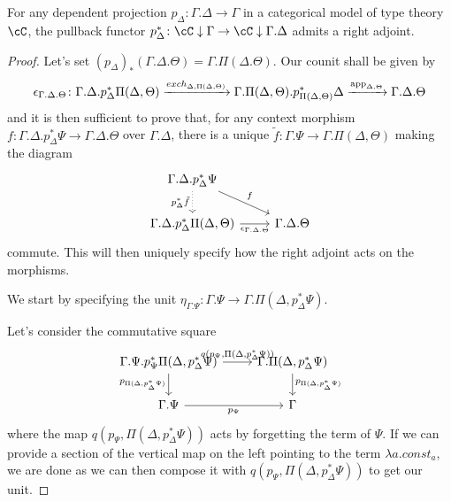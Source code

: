 \documentclass[a4paper,fontsize=12pt]{scrartcl}
\begin{document}
\begin{lem}
  For any dependent projection $p_\Delta\colon\Gamma.\Delta\rightarrow\Gamma$ in
  a categorical model of type theory $\cC$, the pullback functor
  $p_\Delta^*\colon\cC\downarrow\Gamma\rightarrow\cC\downarrow\Gamma.\Delta$
  admits a right adjoint.
\end{lem}
\begin{proof}
  Let's set $(p_\Delta)_*(\Gamma.\Delta.\Theta)=\Gamma.\Pi(\Delta.\Theta)$. Our
  counit shall be given by
  \[\epsilon_{\Gamma.\Delta.\Theta}\colon\Gamma.\Delta.p^*_\Delta\Pi(\Delta,\Theta)
  \xrightarrow{exch_{\Delta,\Pi(\Delta,\Theta)}}\Gamma.\Pi(\Delta,\Theta).p^*_{\Pi(\Delta,\Theta)}\Delta
  \xrightarrow{\operatorname{app}_{\Delta,\Theta}}\Gamma.\Delta.\Theta\]
  and it is then sufficient to prove that, for any context morphism
  $f\colon\Gamma.\Delta.p^*_\Delta\Psi\rightarrow\Gamma.\Delta.\Theta$ over
  $\Gamma.\Delta$, there is
  a unique $\tilde{f}\colon\Gamma.\Psi\rightarrow\Gamma.\Pi(\Delta,\Theta)$
  making the diagram
  \[\begin{tikzcd}
    {\Gamma.\Delta.p^*_\Delta\Psi} \\
    {\Gamma.\Delta.p^*_\Delta\Pi(\Delta,\Theta)} & {\Gamma.\Delta.\Theta}
    \arrow["f", from=1-1, to=2-2]
    \arrow["{\epsilon_{\Gamma.\Delta.\Theta}}"', from=2-1, to=2-2]
    \arrow["{p^*_\Delta\tilde{f}}"', dotted, from=1-1, to=2-1]
  \end{tikzcd}\]
  commute. This will then uniquely specify how the right adjoint acts on the
  morphisms.

  We start by specifying the unit
  $\eta_{\Gamma.\Psi}\colon\Gamma.\Psi\rightarrow\Gamma.\Pi(\Delta,p^*_{\Delta}\Psi)$.

  Let's consider the commutative square
  \[\begin{tikzcd}
    {\Gamma.\Psi.p^*_\Psi\Pi(\Delta,p^*_\Delta\Psi)} & {\Gamma.\Pi(\Delta,p^*_\Delta\Psi)} \\
    {\Gamma.\Psi} & \Gamma
    \arrow["{p_{\Pi(\Delta,p^*_\Delta\Psi)}}"', from=1-1, to=2-1]
    \arrow["{p_{\Psi}}"', from=2-1, to=2-2]
    \arrow["{p_{\Pi(\Delta,p^*_\Delta\Psi)}}", from=1-2, to=2-2]
    \arrow["{q(p_\Psi,\Pi(\Delta,p^*_\Delta\Psi))}", from=1-1, to=1-2]
  \end{tikzcd}\]
  where the map $q(p_\Psi,\Pi(\Delta,p^*_\Delta\Psi))$ acts by forgetting the
  term of $\Psi$. If we can provide a section of the vertical map on the left
  pointing to the term $\lambda a.const_a$, we are done as we can then compose
  it with $q(p_\Psi,\Pi(\Delta,p^*_\Delta\Psi))$ to get our unit.
  

\end{proof}
\end{document}
